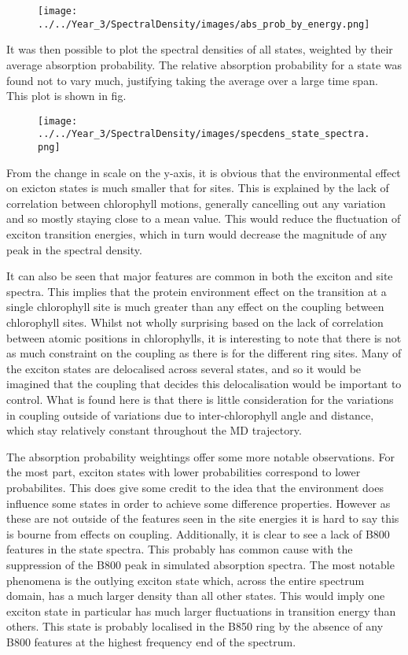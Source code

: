\begin{figure}
    \centering
    \texttt{[image: ../../Year\_3/SpectralDensity/images/abs\_prob\_by\_energy.png]}
\end{figure}

It was then possible to plot the spectral densities
of all states, weighted by their average absorption probability. The relative absorption 
probability for a state was found not to vary much, justifying taking the average
over a large time span. This plot is shown in fig.

\begin{figure}
    \centering
    \texttt{[image: ../../Year\_3/SpectralDensity/images/specdens\_state\_spectra.png]}
\end{figure}

From the change in scale on the y-axis, it is obvious that the environmental effect
on exicton states is much smaller that for sites. This is explained by the lack
of correlation between chlorophyll motions, generally cancelling out any variation
and so mostly staying close to a mean value. This would reduce the fluctuation of
exciton transition energies, which in turn would decrease the magnitude of any peak 
in the spectral density.

It can also be seen that major features are common in both the exciton and site spectra.
This implies that the protein environment effect on the transition at a single chlorophyll
site is much greater than any effect on the coupling between chlorophyll sites.
Whilst not wholly surprising based on the lack of correlation between atomic positions
in chlorophylls, it is interesting to note that there is not as much constraint
on the coupling as there is for the different ring sites. Many of the exciton states
are delocalised across several states, and so it would be imagined that the coupling
that decides this delocalisation would be important to control. What is found here
is that there is little consideration for the variations in coupling outside of
variations due to inter-chlorophyll angle and distance, which stay relatively constant
throughout the MD trajectory.

The absorption probability weightings offer some more notable observations. For
the most part, exciton states with lower probabilities correspond to lower probabilites.
This does give some credit to the idea that the environment does influence some
states in order to achieve some difference properties. However as these are not
outside of the features seen in the site energies it is hard to say this is bourne
from effects on coupling. Additionally, it is clear to see a lack of B800 features 
in the state spectra. This probably has common cause with the suppression of the
B800 peak in simulated absorption spectra. The most notable phenomena is the outlying
exciton state which, across the entire spectrum domain, has a much larger density
than all other states. This would imply one exciton state in particular has much
larger fluctuations in transition energy than others. This state is probably localised
in the B850 ring by the absence of any B800 features at the highest frequency end
of the spectrum. 

